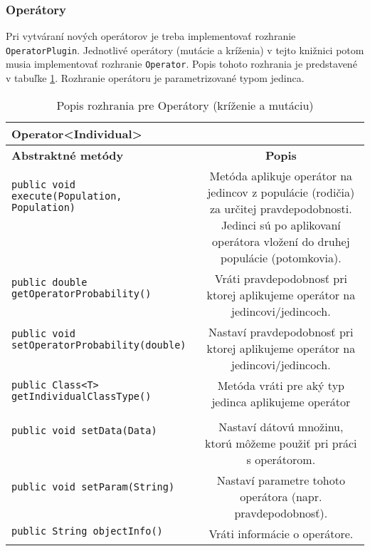 \subsubsection*{Operátory}
Pri vytváraní nových operátorov je treba implementovať rozhranie \verb|OperatorPlugin|. Jednotlivé operátory (mutácie a kríženia) v tejto knižnici potom musia implementovať rozhranie \verb|Operator|. Popis tohoto rozhrania je predstavené v tabuľke \ref{fig:tabop}.
Rozhranie operátoru je parametrizované typom jedinca.


\begin{table}
\centering
\begin{tabular}{|l|c|}
\hline
\textbf{Operator<Individual>} & \\
\hline\hline
\textbf{Abstraktné metódy} & \textbf{Popis} \\
\hline
\verb|public void execute(Population, Population)| & \multirow{7}{5cm}{Metóda aplikuje operátor na jedincov z populácie (rodičia) za určitej pravdepodobnosti. Jedinci sú po aplikovaní operátora vložení do druhej populácie (potomkovia). } \\
& \\
& \\
& \\
& \\
& \\
& \\
\hline
\verb|public double getOperatorProbability()| & \multirow{3}{5cm}{Vráti pravdepodobnosť pri ktorej aplikujeme operátor na jedincovi/jedincoch.} \\
& \\
& \\
\hline
\verb|public void setOperatorProbability(double)| & \multirow{4}{5cm}{Nastaví pravdepodobnosť pri ktorej aplikujeme operátor na jedincovi/jedincoch.} \\
& \\
& \\
& \\
\hline
\verb|public Class<T> getIndividualClassType()| & \multirow{2}{5cm}{Metóda vráti pre aký typ jedinca aplikujeme operátor} \\
& \\
& \\
\hline
\verb|public void setData(Data)| & \multirow{4}{5cm}{Nastaví dátovú množinu, ktorú môžeme použiť pri práci s operátorom.} \\
& \\
& \\
& \\
\hline
\verb|public void setParam(String)| & \multirow{3}{5cm}{Nastaví parametre tohoto operátora (napr. pravdepodobnosť).} \\
& \\
& \\
\hline
\verb|public String objectInfo()| & \multirow{2}{5cm}{Vráti informácie o operátore.} \\
& \\ 
\hline
\end{tabular}
\caption{Popis rozhrania pre Operátory (kríženie a mutáciu)}\label{fig:tabop}
\end{table}

